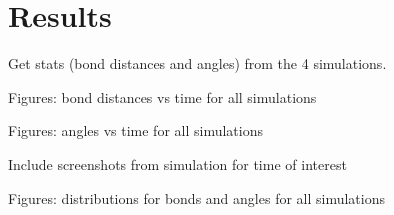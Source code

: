\section{Results} %
\label{sec:results}

Get stats (bond distances and angles) from the 4 simulations.



Figures: bond distances vs time for all simulations

Figures: angles vs time for all simulations

Include screenshots from simulation for time of interest

Figures: distributions for bonds and angles for all simulations

